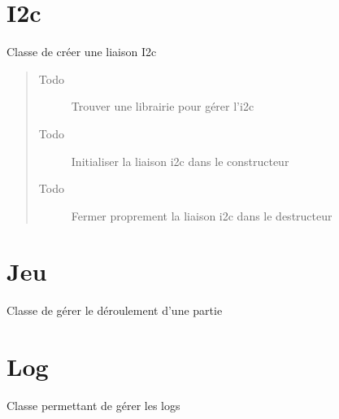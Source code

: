 \documentclass[letterpaper,10pt,french]{sphinxmanual}
\begin{document}
\chapter{I2c}
\label{i2c:i2c}\label{i2c::doc}\label{i2c:module-lib.i2c}

\begin{fulllineitems}
\label{i2c:lib.i2c.I2c}
Classe de créer une liaison I2c
\begin{quote}\begin{description}
\item[{Todo }] \leavevmode
Trouver une librairie pour gérer l'i2c

\item[{Todo }] \leavevmode
Initialiser la liaison i2c dans le constructeur

\item[{Todo }] \leavevmode
Fermer proprement la liaison i2c dans le destructeur

\end{description}\end{quote}

\end{fulllineitems}



\chapter{Jeu}
\label{jeu:module-lib.jeu}\label{jeu::doc}\label{jeu:jeu}

\begin{fulllineitems}
\label{jeu:lib.jeu.Jeu}
Classe de gérer le déroulement d'une partie

\end{fulllineitems}



\chapter{Log}
\label{log:module-lib.log}\label{log::doc}\label{log:log}

\begin{fulllineitems}
\label{log:lib.log.Log}
Classe permettant de gérer les logs

\end{fulllineitems}
\end{document}
